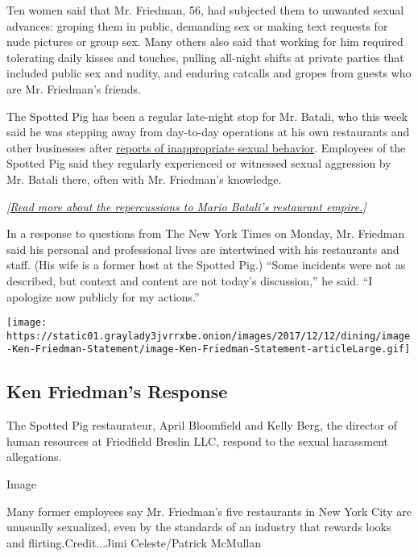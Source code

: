 Ten women said that Mr. Friedman, 56, had subjected them to unwanted
sexual advances: groping them in public, demanding sex or making text
requests for nude pictures or group sex. Many others also said that
working for him required tolerating daily kisses and touches, pulling
all-night shifts at private parties that included public sex and nudity,
and enduring catcalls and gropes from guests who are Mr. Friedman's
friends.

The Spotted Pig has been a regular late-night stop for Mr. Batali, who
this week said he was stepping away from day-to-day operations at his
own restaurants and other businesses after
\href{https://www.nytimes3xbfgragh.onion/2017/12/11/dining/mario-batali-sexual-misconduct.html}{reports
of inappropriate sexual behavior}. Employees of the Spotted Pig said
they regularly experienced or witnessed sexual aggression by Mr. Batali
there, often with Mr. Friedman's knowledge.

\emph{{[}}\href{https://www.nytimes3xbfgragh.onion/2019/03/06/dining/mario-batali-bastianich-restaurants.html}{\emph{Read
more about the repercussions to Mario Batali's restaurant
empire.}}\emph{{]}}

In a response to questions from The New York Times on Monday, Mr.
Friedman said his personal and professional lives are intertwined with
his restaurants and staff. (His wife is a former host at the Spotted
Pig.) ``Some incidents were not as described, but context and content
are not today's discussion,'' he said. ``I apologize now publicly for my
actions.''

\href{https://www.nytimes3xbfgragh.onion/interactive/2017/12/12/dining/document-Ken-Friedman-Statement.html}{}

\texttt{[image: https://static01.graylady3jvrrxbe.onion/images/2017/12/12/dining/image-Ken-Friedman-Statement/image-Ken-Friedman-Statement-articleLarge.gif]}

\hypertarget{ken-friedmans-response}{%
\subsection{Ken Friedman's Response}\label{ken-friedmans-response}}

The Spotted Pig restaurateur, April Bloomfield and Kelly Berg, the
director of human resources at Friedfield Breslin LLC, respond to the
sexual harassment allegations.

Image

Many former employees say Mr. Friedman's five restaurants in New York
City are unusually sexualized, even by the standards of an industry that
rewards looks and flirting.Credit...Jimi Celeste/Patrick McMullan

